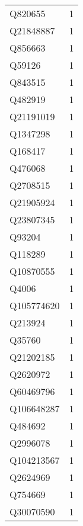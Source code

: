 \begin{tabular}{lr}
     Q820655 &                             1 \\
   Q21848887 &                             1 \\
     Q856663 &                             1 \\
      Q59126 &                             1 \\
     Q843515 &                             1 \\
     Q482919 &                             1 \\
   Q21191019 &                             1 \\
    Q1347298 &                             1 \\
     Q168417 &                             1 \\
     Q476068 &                             1 \\
    Q2708515 &                             1 \\
   Q21905924 &                             1 \\
   Q23807345 &                             1 \\
      Q93204 &                             1 \\
     Q118289 &                             1 \\
   Q10870555 &                             1 \\
       Q4006 &                             1 \\
  Q105774620 &                             1 \\
     Q213924 &                             1 \\
      Q35760 &                             1 \\
   Q21202185 &                             1 \\
    Q2620972 &                             1 \\
   Q60469796 &                             1 \\
  Q106648287 &                             1 \\
     Q484692 &                             1 \\
    Q2996078 &                             1 \\
  Q104213567 &                             1 \\
    Q2624969 &                             1 \\
     Q754669 &                             1 \\
   Q30070590 &                             1 \\

\end{tabular}
